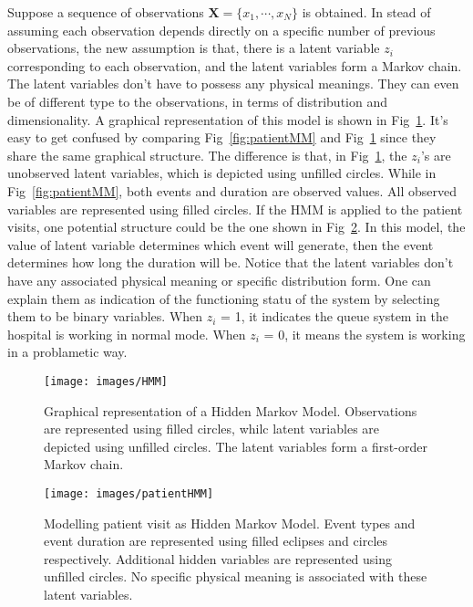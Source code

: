 Suppose a sequence of observations \(\mathbf{X} = \{x_1, \cdots, x_N\}\) is obtained. In stead of assuming each observation depends directly on a specific number of previous observations, the new assumption is that, there is a latent variable \(z_i\) corresponding to each observation, and the latent variables form a Markov chain. The latent variables don't have to possess any physical meanings. They can even be of different type to the observations, in terms of distribution and dimensionality. A graphical representation of this model is shown in Fig~\ref{fig:HMM}. It's easy to get confused by comparing Fig~\ref{fig:patientMM} and Fig~\ref{fig:HMM} since they share the same graphical structure. The difference is that, in Fig~\ref{fig:HMM}, the \(z_i\)'s are unobserved latent variables, which is depicted using unfilled circles. While in Fig~\ref{fig:patientMM}, both events and duration are observed values. All observed variables are represented using filled circles. If the HMM is applied to the patient visits, one potential structure could be the one shown in Fig~\ref{fig:patientHMM}. In this model, the value of latent variable determines which event will generate, then the event determines how long the duration will be. Notice that the latent variables don't have any associated physical meaning or specific distribution form. One can explain them as indication of the functioning statu of the system by selecting them to be binary variables. When \(z_i\) = 1, it indicates the queue system in the hospital is working in normal mode. When \(z_i\) = 0, it means the system is working in a problametic way.

\begin{figure}[ht]
	\begin{center}
		\texttt{[image: images/HMM]}
		\caption{Graphical representation of a Hidden Markov Model. Observations are represented using filled circles, whilc latent variables are depicted using unfilled circles. The latent variables form a first-order Markov chain.}
		\label{fig:HMM}
	\end{center}
\end{figure}

\begin{figure}[ht]
	\begin{center}
		\texttt{[image: images/patientHMM]}
		\caption{Modelling patient visit as Hidden Markov Model. Event types and event duration are represented using filled eclipses and circles respectively. Additional hidden variables are represented using unfilled circles. No specific physical meaning is associated with these latent variables.}
		\label{fig:patientHMM}
	\end{center}
\end{figure}

